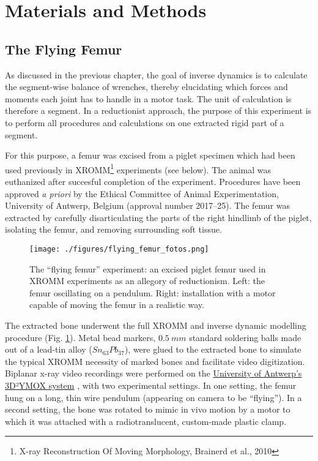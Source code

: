 \FloatBarrier\clearpage
\section{Materials and Methods}
\label{sec:org9811fab}
\subsection{The Flying Femur}
\label{sec:org5fbffa2}

As discussed in the previous chapter, the goal of inverse dynamics is to calculate the segment-wise balance of wrenches, thereby elucidating which forces and moments each joint has to handle in a motor task.
The unit of calculation is therefore a segment.
In a reductionist approach, the purpose of this experiment is to perform all procedures and calculations on one extracted rigid part of a segment.

For this purpose, a femur was excised from a piglet specimen which had been used previously in XROMM\footnote{X-ray Reconstruction Of Moving Morphology, Brainerd et al., 2010} experiments (see below). \nocite{Brainerd2010}
The animal was euthanized after succesful completion of the experiment.
Procedures have been approved \emph{a priori} by the Ethical Committee of Animal Experimentation, University of Antwerp, Belgium (approval number 2017–25).
The femur was extracted by carefully disarticulating the parts of the right hindlimb of the piglet, isolating the femur, and removing surrounding soft tissue.

\begin{figure}[p]
\centering
\texttt{[image: ./figures/flying\_femur\_fotos.png]}
\caption{\label{fig:flying_femur_fotos}The ``flying femur'' experiment: an excised piglet femur used in XROMM experiments as an allegory of reductionism. Left: the femur oscillating on a pendulum. Right: installation with a motor capable of moving the femur in a realistic way.}
\end{figure}


The extracted bone underwent the full XROMM and inverse dynamic modelling procedure (Fig. \ref{fig:flying_femur_fotos}).
Metal bead markers, \(0.5\ mm\) standard soldering balls made out of a lead-tin alloy (\(Sn_{63}Pb_{37}\)), were glued to the extracted bone to simulate the typical XROMM necessity of marked bones and facilitate video digitization.
Biplanar x-ray video recordings were performed on the \href{https://www.uantwerpen.be/3d2ymox}{University of Antwerp's 3D²YMOX system} \citep{Nguyen2021,Sanctorum2020}, with two experimental settings.
In one setting, the femur hung on a long, thin wire pendulum (appearing on camera to be ``flying'').
In a second setting, the bone was rotated to mimic in vivo motion by a motor to which it was attached with a radiotranslucent, custom-made plastic clamp.

